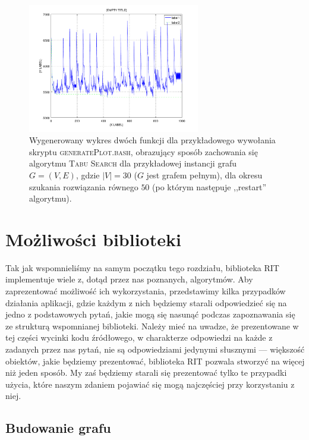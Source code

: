 \begin{figure}[!htbp]
	\null\hfill
	\includegraphics[width=0.67\textwidth]{Appendix_I/GENERATE-PLOT-example/1}
	\hfill\null
	\caption{
		Wygenerowany wykres dwóch funkcji dla przykładowego wywołania skryptu \textsc{generatePlot.bash}, obrazujący sposób zachowania się algorytmu \textsc{Tabu Search} dla przykładowej instancji grafu $G = \left( V, E \right)$, gdzie $\left| V \right| = 30$ ($G$ jest grafem pełnym), dla okresu szukania rozwiązania równego $50$ (po którym następuje ,,restart'' algorytmu).
	}
	\label{fig:genplot}
\end{figure}

\section{Możliwości biblioteki}

Tak jak wspomnieliśmy na samym początku tego rozdziału, biblioteka \textsc{RIT} implementuje wiele z, dotąd przez nas poznanych, algorytmów. Aby zaprezentować możliwość ich wykorzystania, przedstawimy kilka przypadków działania aplikacji, gdzie każdym z nich będziemy starali odpowiedzieć się na jedno z podstawowych pytań, jakie mogą się nasunąć podczas zapoznawania się ze strukturą wspomnianej biblioteki. Należy mieć na uwadze, że prezentowane w tej części wycinki kodu źródłowego, w charakterze odpowiedzi na każde z zadanych przez nas pytań, nie są odpowiedziami jedynymi słusznymi --- większość obiektów, jakie będziemy prezentować, biblioteka \textsc{RIT} pozwala stworzyć na więcej niż jeden sposób. My zaś będziemy starali się prezentować tylko te przypadki użycia, które naszym zdaniem pojawiać się mogą najczęściej przy korzystaniu z niej.

\subsection{Budowanie grafu}

